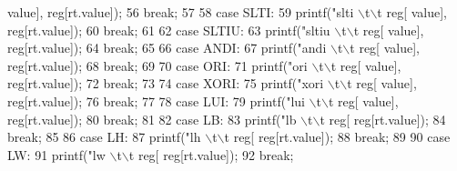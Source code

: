 \begin{DoxyCode}
{{{{{{{{      value], reg[rt.value]);
56         \textcolor{keywordflow}{break};
57 
58     \textcolor{keywordflow}{case} SLTI:
59         printf(\textcolor{stringliteral}{"slti \(\backslash\)t\(\backslash\)t reg[%
      value], reg[rt.value]);
60         \textcolor{keywordflow}{break};
61 
62     \textcolor{keywordflow}{case} SLTIU:
63         printf(\textcolor{stringliteral}{"sltiu \(\backslash\)t\(\backslash\)t reg[%
      value], reg[rt.value]);
64         \textcolor{keywordflow}{break};
65 
66     \textcolor{keywordflow}{case} ANDI:
67         printf(\textcolor{stringliteral}{"andi \(\backslash\)t\(\backslash\)t reg[%
      value], reg[rt.value]);
68         \textcolor{keywordflow}{break};
69 
70     \textcolor{keywordflow}{case} ORI:
71         printf(\textcolor{stringliteral}{"ori \(\backslash\)t\(\backslash\)t reg[%
      value], reg[rt.value]);
72         \textcolor{keywordflow}{break};
73 
74     \textcolor{keywordflow}{case} XORI:
75         printf(\textcolor{stringliteral}{"xori \(\backslash\)t\(\backslash\)t reg[%
      value], reg[rt.value]);
76         \textcolor{keywordflow}{break};
77 
78     \textcolor{keywordflow}{case} LUI:
79         printf(\textcolor{stringliteral}{"lui \(\backslash\)t\(\backslash\)t reg[%
      value], reg[rt.value]);
80         \textcolor{keywordflow}{break};
81 
82     \textcolor{keywordflow}{case} LB:
83         printf(\textcolor{stringliteral}{"lb \(\backslash\)t\(\backslash\)t reg[%
      reg[rt.value]);
84         \textcolor{keywordflow}{break};
85 
86     \textcolor{keywordflow}{case} LH:
87         printf(\textcolor{stringliteral}{"lh \(\backslash\)t\(\backslash\)t reg[%
      reg[rt.value]);
88         \textcolor{keywordflow}{break};
89 
90     \textcolor{keywordflow}{case} LW:
91         printf(\textcolor{stringliteral}{"lw \(\backslash\)t\(\backslash\)t reg[%
      reg[rt.value]);
92         \textcolor{keywordflow}{break};
}}}}}}}}}}}}}}}}}
\end{DoxyCode}
